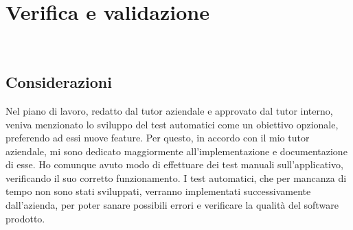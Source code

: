 
\chapter{Verifica e validazione}
\label{cap:verifica-validazione}

\\

\section{Considerazioni}
\label{sec:considerazioni}

Nel piano di lavoro, redatto dal tutor aziendale e approvato dal tutor interno, veniva menzionato lo sviluppo del test automatici come un obiettivo opzionale, preferendo ad essi nuove feature. Per questo, in accordo con il mio tutor aziendale, mi sono dedicato maggiormente all’implementazione e documentazione di esse. Ho comunque avuto modo di effettuare dei test manuali sull’applicativo, verificando il suo corretto funzionamento. I test automatici, che per mancanza di tempo non sono stati sviluppati, verranno implementati successivamente dall’azienda, per poter sanare possibili errori e verificare la qualità del software prodotto.

